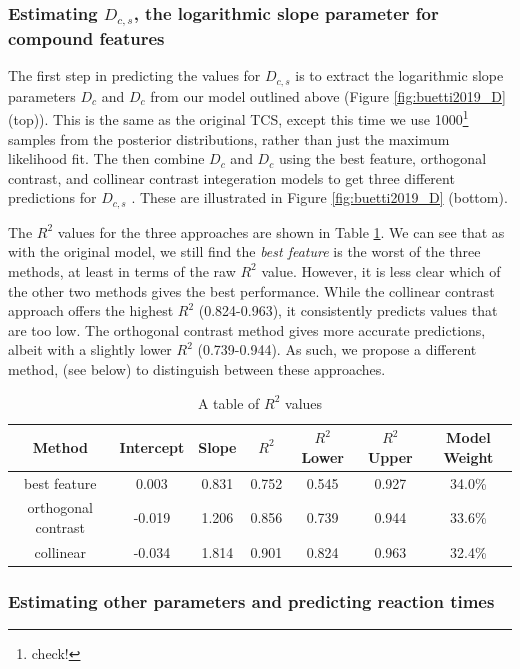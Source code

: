 \documentclass[smallextended, natbib]{svjour3}       %
\begin{document}
\subsubsection{Estimating $D_{c,s}$, the logarithmic slope parameter for compound features}

The first step in predicting the values for $D_{c,s}$ is to extract the logarithmic slope parameters $D_c$ and $D_c$ from our model outlined above (Figure \ref{fig:buetti2019_D} (top)). This is the same as the original TCS, except this time we use 1000\footnote{check!} samples from the posterior distributions, rather than just the maximum likelihood fit. The then combine $D_c$ and $D_c$ using the best feature, orthogonal contrast, and collinear contrast integeration models to get three different predictions for $D_{c,s}$ . These are illustrated in Figure \ref{fig:buetti2019_D} (bottom).

The $R^2$ values for the three approaches are shown in Table \ref{tab:reimp_D_r2}. We can see that as with the original model, we still find the \textit{best feature} is the worst of the three methods, at least in terms of the raw $R^2$ value. However, it is less clear which of the other two methods gives the best performance. While the collinear contrast approach offers the highest $R^2$ (0.824-0.963), it consistently predicts values that are too low. The orthogonal contrast method gives more accurate predictions, albeit with a slightly lower $R^2$ (0.739-0.944). As such, we propose a different method, (see below) to distinguish between these approaches. 

\begin{table}[h]
\centering
\begin{tabular}{ c|cc|ccc|c } 
Method & Intercept & Slope & $R^2$ & $R^2$ Lower & $R^2$ Upper & Model Weight\\
 \hline 
best feature & 0.003 & 0.831 & 0.752 & 0.545 & 0.927 & 34.0\%\\ 
orthogonal contrast & -0.019 & 1.206 & 0.856 & 0.739 & 0.944 & 33.6\%\\ 
collinear & -0.034 & 1.814	& 0.901 & 0.824 & 0.963 & 32.4\%\\
\end{tabular}
\caption{A table of $R^2$ values}
\label{tab:reimp_D_r2}
\end{table}

\subsubsection{Estimating other parameters and predicting reaction times}
\end{document}
